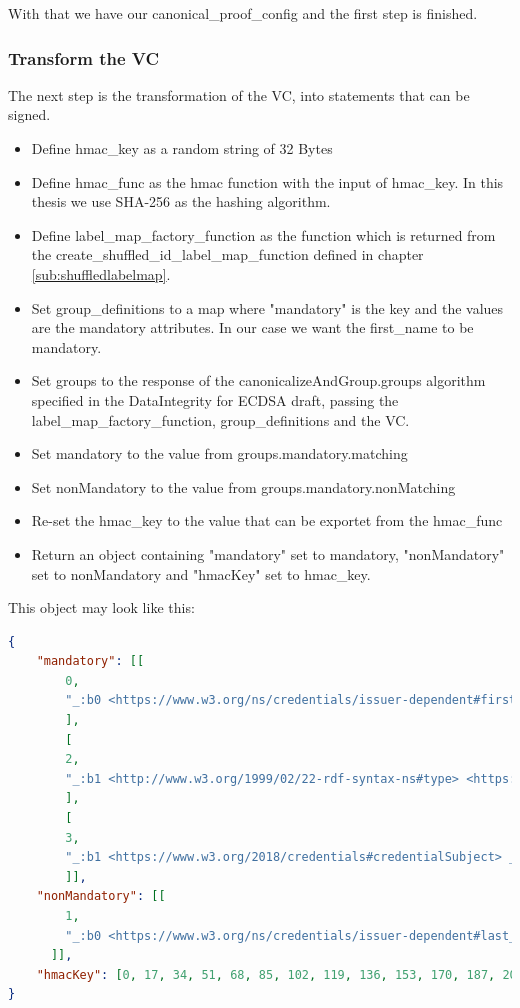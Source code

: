 \documentclass[
	a4paper               %
	,bibliography=totoc   %
	,listof=totoc         %
	,monolingual
	twoside=false,
]{bfhthesis}              %
\begin{document}
With that we have our canonical\_proof\_config and the first step is finished.

\subsubsection{Transform the VC}
\label{chap:transform}
The next step is the transformation of the VC, into statements that can be signed.

\begin{itemize}
	\item Define hmac\_key as a random string of 32 Bytes
	\item Define hmac\_func as the hmac function with the input of hmac\_key. In this thesis we use SHA-256 as the hashing algorithm.
	\item Define label\_map\_factory\_function as the function which is returned from the create\_shuffled\_id\_label\_map\_function defined in chapter \ref{sub:shuffledlabelmap}.
	\item Set group\_definitions to a map where "mandatory" is the key and the values are the mandatory attributes. In our case we want the first\_name to be mandatory.
	\item Set groups to the response of the canonicalizeAndGroup.groups algorithm specified in the DataIntegrity for ECDSA draft\cite{ecdsa}, passing the label\_map\_factory\_function, group\_definitions and the VC.
	\item Set mandatory to the value from groups.mandatory.matching
	\item Set nonMandatory to the value from groups.mandatory.nonMatching
	\item Re-set the hmac\_key to the value that can be exportet from the hmac\_func
	\item Return an object containing "mandatory" set to mandatory, "nonMandatory" set to nonMandatory and "hmacKey" set to hmac\_key.
\end{itemize}

This object may look like this:

\begin{lstlisting}[language=json,firstnumber=1,caption={Return object of the VC transformation},captionpos=b]
{
	"mandatory": [[
		0,
		"_:b0 <https://www.w3.org/ns/credentials/issuer-dependent#first_name> \"Joel\" .\n",
		],
		[
		2,
		"_:b1 <http://www.w3.org/1999/02/22-rdf-syntax-ns#type> <https://www.w3.org/2018/credentials#VerifiableCredential> .\n",
		],
		[
		3,
		"_:b1 <https://www.w3.org/2018/credentials#credentialSubject> _:b0 .\n",
		]],
	"nonMandatory": [[
		1,
		"_:b0 <https://www.w3.org/ns/credentials/issuer-dependent#last_name> \"Robles\" .\n",
	  ]],
	"hmacKey": [0, 17, 34, 51, 68, 85, 102, 119, 136, 153, 170, 187, 204, 221, 238, 255, 0, 17, 34, 51, 68, 85, 102, 119, 136, 153, 170, 187, 204, 221, 238, 255],
}
\end{lstlisting}
\end{document}
